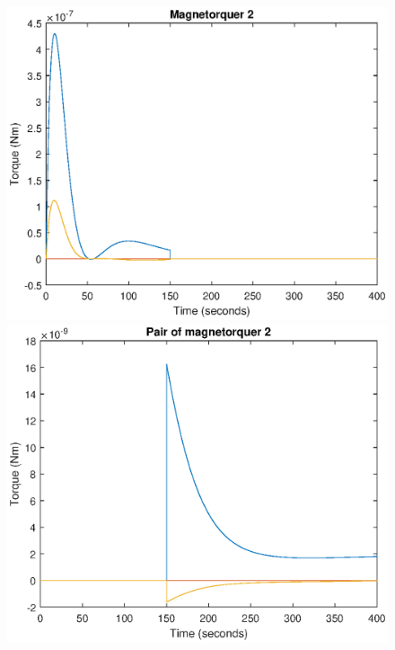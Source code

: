 \begin{figure}[ht]  
	\begin{minipage}{0.5\textwidth}
		\includegraphics[width=\textwidth]{figures/config2.eps}
	\end{minipage}
	\hfill
	\begin{minipage}{0.5\textwidth}
		\includegraphics[width=\textwidth]{figures/config22.eps}
	\end{minipage}
\end{figure}    
